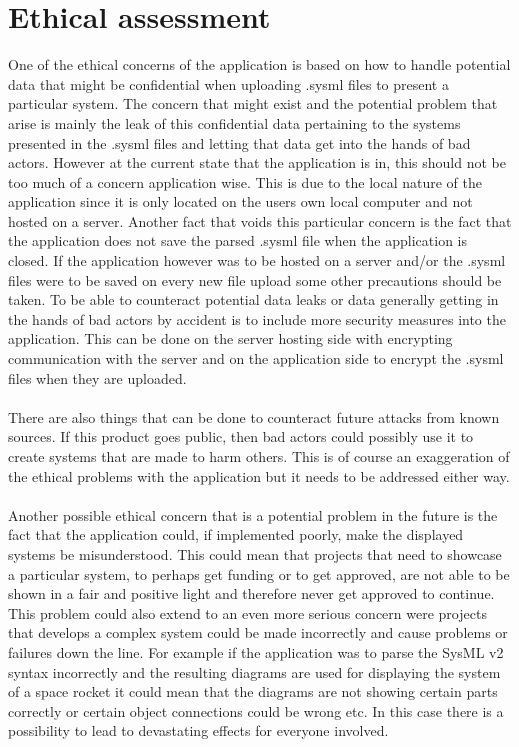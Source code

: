 \documentclass{article}
\begin{document}
\section{Ethical assessment}
One of the ethical concerns of the application is based on how to handle potential data that might be confidential when uploading .sysml files to present a particular system. The concern that might exist and the potential problem that arise is mainly the leak of this confidential data pertaining to the systems presented in the .sysml files and letting that data get into the hands of bad actors. However at the current state that the application is in, this should not be too much of a concern application wise. This is due to the local nature of the application since it is only located on the users own local computer and not hosted on a server. Another fact that voids this particular concern is the fact that the application does not save the parsed .sysml file when the application is closed. If the application however was to be hosted on a server and/or the .sysml files were to be saved on every new file upload some other precautions should be taken. To be able to counteract potential data leaks or data generally getting in the hands of bad actors by accident is to include more security measures into the application. This can be done on the server hosting side with encrypting communication with the server and on the application side to encrypt the .sysml files when they are uploaded. 
\\\\
There are also things that can be done to counteract future attacks from known sources. If this product goes public, then bad actors could possibly use it to create systems that are made to harm others. This is of course an exaggeration of the ethical problems with the application but it needs to be addressed either way.
\\\\
Another possible ethical concern that is a potential problem in the future is the fact that the application could, if implemented poorly, make the displayed systems be misunderstood. This could mean that projects that need to showcase a particular system, to perhaps get funding or to get approved, are not able to be shown in a fair and positive light and therefore never get approved to continue. This problem could also extend to an even more serious concern were projects that develops a complex system could be made incorrectly and cause problems or failures down the line. For example if the application was to parse the SysML v2 syntax incorrectly and the resulting diagrams are used for displaying the system of a space rocket it could mean that the diagrams are not showing certain parts correctly or certain object connections could be wrong etc. In this case there is a possibility to lead to devastating effects for everyone involved.
\end{document}
